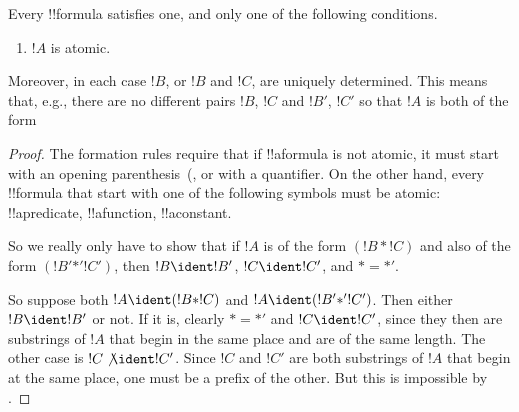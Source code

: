 \documentclass[../../include/open-logic-section]{subfiles}
\begin{document}
\begin{prop}
Every !!{formula} satisfies one, and only one of the following conditions.
\begin{enumerate}
\item $!A$ is atomic.







\end{enumerate}
Moreover, in each case $!B$, or $!B$ and $!C$, are uniquely
determined.  This means that, e.g., there are no different pairs $!B$,
$!C$ and $!B'$, $!C'$ so that $!A$ is both of the form 
\end{prop}

\begin{proof}
The formation rules require that if !!a{formula} is not atomic, it
must start with an opening parenthesis~(, 
or with a quantifier. On the other hand, every !!{formula} that start with
one of the following symbols must be atomic: !!a{predicate}, !!a{function}, !!a{constant}.

So we really only have to show that if $!A$ is of the form $(!B \ast
!C)$ and also of the form $(!B' \mathbin{\ast'} !C')$, then $!B \ident
!B'$, $!C \ident !C'$, and $\ast = {\ast'}$.

So suppose both $!A \ident (!B \ast !C)$ and $!A \ident (!B'
\mathbin{\ast'} !C')$.  Then either $!B \ident !B'$ or not.  If it is,
clearly $\ast = {\ast'}$ and $!C \ident !C'$, since they then are
substrings of $!A$ that begin in the same place and are of the same
length.  The other case is $!C \not\ident !C'$.  Since $!C$ and
$!C'$ are both substrings of $!A$ that begin at the same place, one
must be a prefix of the other.  But this is impossible by
.
\end{proof}
\end{document}
